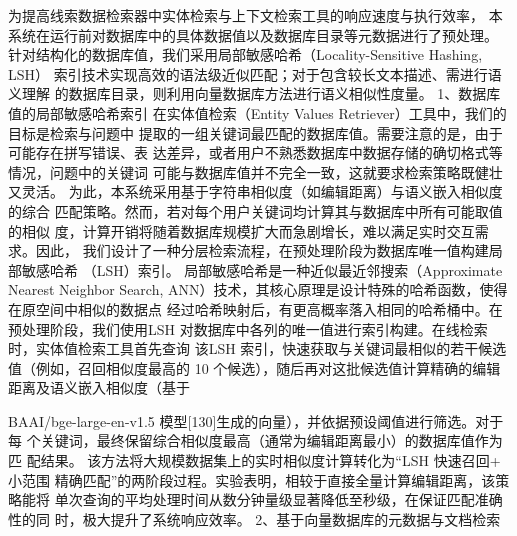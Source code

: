 \documentclass[12pt,a4paper,openright,UTF8]{ctexbook}
\begin{document}
为提高线索数据检索器中实体检索与上下文检索工具的响应速度与执行效率， 本系统在运行前对数据库中的具体数据值以及数据库目录等元数据进行了预处理。 针对结构化的数据库值，我们采用局部敏感哈希（Locality-Sensitive Hashing, LSH） 索引技术实现高效的语法级近似匹配；对于包含较长文本描述、需进行语义理解 的数据库目录，则利用向量数据库方法进行语义相似性度量。 1、数据库值的局部敏感哈希索引 在实体值检索（Entity Values Retriever）工具中，我们的目标是检索与问题中 提取的一组关键词最匹配的数据库值。需要注意的是，由于可能存在拼写错误、表 达差异，或者用户不熟悉数据库中数据存储的确切格式等情况，问题中的关键词 可能与数据库值并不完全一致，这就要求检索策略既健壮又灵活。 为此，本系统采用基于字符串相似度（如编辑距离）与语义嵌入相似度的综合 匹配策略。然而，若对每个用户关键词均计算其与数据库中所有可能取值的相似 度，计算开销将随着数据库规模扩大而急剧增长，难以满足实时交互需求。因此， 我们设计了一种分层检索流程，在预处理阶段为数据库唯一值构建局部敏感哈希 （LSH）索引。 局部敏感哈希是一种近似最近邻搜索（Approximate Nearest Neighbor Search, ANN）技术，其核心原理是设计特殊的哈希函数，使得在原空间中相似的数据点 经过哈希映射后，有更高概率落入相同的哈希桶中。在预处理阶段，我们使用LSH 对数据库中各列的唯一值进行索引构建。在线检索时，实体值检索工具首先查询 该LSH 索引，快速获取与关键词最相似的若干候选值（例如，召回相似度最高的 10 个候选），随后再对这批候选值计算精确的编辑距离及语义嵌入相似度（基于

BAAI/bge-large-en-v1.5 模型[130]生成的向量），并依据预设阈值进行筛选。对于每 个关键词，最终保留综合相似度最高（通常为编辑距离最小）的数据库值作为匹 配结果。 该方法将大规模数据集上的实时相似度计算转化为“LSH 快速召回+ 小范围 精确匹配”的两阶段过程。实验表明，相较于直接全量计算编辑距离，该策略能将 单次查询的平均处理时间从数分钟量级显著降低至秒级，在保证匹配准确性的同 时，极大提升了系统响应效率。 2、基于向量数据库的元数据与文档检索
\end{document}
